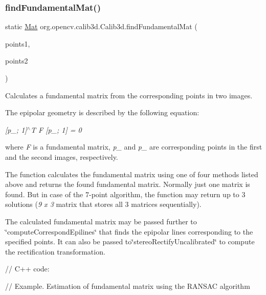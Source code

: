 \subsubsection{\texorpdfstring{find\+Fundamental\+Mat()}{findFundamentalMat()}\hspace{0.1cm}{\footnotesize\ttfamily [3/3]}}
{\footnotesize\ttfamily static \mbox{\hyperlink{classorg_1_1opencv_1_1core_1_1_mat}{Mat}} org.\+opencv.\+calib3d.\+Calib3d.\+find\+Fundamental\+Mat (\begin{DoxyParamCaption}\item[{\mbox{\hyperlink{classorg_1_1opencv_1_1core_1_1_mat_of_point2f}{Mat\+Of\+Point2f}}}]{points1,  }\item[{\mbox{\hyperlink{classorg_1_1opencv_1_1core_1_1_mat_of_point2f}{Mat\+Of\+Point2f}}}]{points2 }\end{DoxyParamCaption})\hspace{0.3cm}{\ttfamily [static]}}

Calculates a fundamental matrix from the corresponding points in two images.

The epipolar geometry is described by the following equation\+:

{\itshape \mbox{[}p\+\_; 1\mbox{]}$^\wedge$T F \mbox{[}p\+\_; 1\mbox{]} = 0}

where {\itshape F} is a fundamental matrix, {\itshape p\+\_} and {\itshape p\+\_} are corresponding points in the first and the second images, respectively.

The function calculates the fundamental matrix using one of four methods listed above and returns the found fundamental matrix. Normally just one matrix is found. But in case of the 7-\/point algorithm, the function may return up to 3 solutions ({\itshape 9 x 3} matrix that stores all 3 matrices sequentially).

The calculated fundamental matrix may be passed further to \char`\"{}compute\+Correspond\+Epilines\char`\"{} that finds the epipolar lines corresponding to the specified points. It can also be passed to\char`\"{}stereo\+Rectify\+Uncalibrated\char`\"{} to compute the rectification transformation. {\ttfamily }

{\ttfamily }

{\ttfamily }

{\ttfamily // C++ code\+:}

{\ttfamily }

{\ttfamily }

{\ttfamily // Example. Estimation of fundamental matrix using the R\+A\+N\+S\+AC algorithm}

